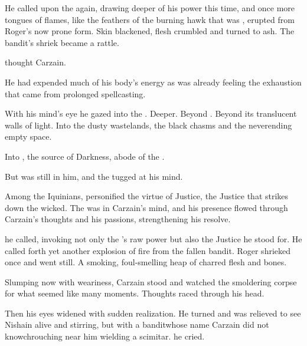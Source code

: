 \ta{\Izion!} 
He called upon the \Sephirah{} again, drawing deeper of his power this time, and once more tongues of flames, like the feathers of the burning hawk that was \Izion, erupted from Roger's now prone form. 
Skin blackened, flesh crumbled and turned to ash. 
The bandit's shriek became a rattle. 

 thought Carzain. 

He had expended much of his body's energy as was already feeling the exhaustion that came from prolonged spellcasting. 

With his mind's eye he gazed into the \empyrean. 
Deeper. 
Beyond \Iquin. 
Beyond its translucent walls of light. 
Into the dusty wastelands, the black chasms and the neverending empty space. 

Into \Itzach{}, the source of Darkness, abode of the \Qliphoth. 


But \Izion{} was still in him, and the \sephirah{} tugged at his mind. 

Among the Iquinians, \Izion{} personified the virtue of Justice, the Justice that strikes down the wicked. 
The \Sephirah{} was in Carzain's mind, and his presence flowed through Carzain's thoughts and his passions, strengthening his resolve. 


\talk{\Izion!} he called, invoking not only the \Sephirah's raw power but also the Justice he stood for. 
He called forth yet another explosion of fire from the fallen bandit. 
Roger shrieked once and went still. 
A smoking, foul-smelling heap of charred flesh and bones. 

Slumping now with weariness, Carzain stood and watched the smoldering corpse for what seemed like many moments. 
Thoughts raced through his head. 

Then his eyes widened with sudden realization. 
He turned and was relieved to see Nishain alive and stirring, but with a bandit\dash{}whose name Carzain did not know\dash{}chrouching near him wielding a  scimitar. 
 he cried.

